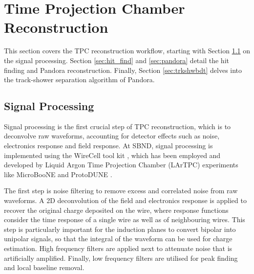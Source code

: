 \section{Time Projection Chamber Reconstruction}
\label{sec:reco_tpc}

This section covers the TPC reconstruction workflow, starting with Section \ref{sec:signal_process} on the signal processing.
Section \ref{sec:hit_find} and \ref{sec:pandora} detail the hit finding and Pandora reconstruction.
Finally, Section \ref{sec:trkshwbdt} delves into the track-shower separation algorithm  of Pandora. 

\subsection{Signal Processing}
\label{sec:signal_process}

Signal processing is the first crucial step of TPC reconstruction, which is to deconvolve raw waveforms, accounting for detector effects such as noise, electronics response and field response. 
At SBND, signal processing is implemented using the WireCell tool kit \cite{wirecell}, which has been employed and developed by Liquid Argon Time Projection Chamber (LArTPC) experiments like MicroBooNE \cite{wirecell} and ProtoDUNE \cite{wirecell_protodune}.

The first step is noise filtering to remove excess and correlated noise from raw waveforms.
A 2D deconvolution of the field and electronics response is applied to recover the original charge deposited on the wire, where response functions consider the time response of a single wire as well as of neighbouring wires.
This step is particularly important for the induction planes to convert bipolar into unipolar signals, so that the integral of the waveform can be used for charge estimation.
High frequency filters are applied next to attenuate noise that is artificially amplified.
Finally, low frequency filters are utilised for peak finding and local baseline removal.

